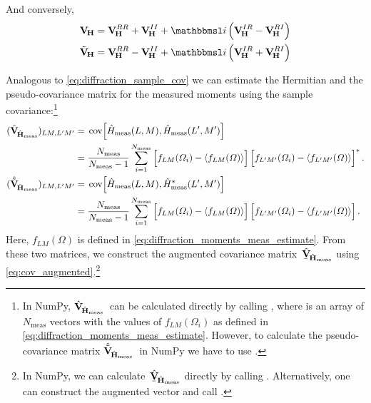 And conversely,
\begin{align}
  \covMatSym_{\!\vect{H}}
  = \covMatSym_{\!\vect{H}}^{RR} + \covMatSym_{\!\vect{H}}^{II} + \imag \rBrk{\covMatSym_{\!\vect{H}}^{IR} - \covMatSym_{\!\vect{H}}^{RI}}
  \\
  \tilde{\covMatSym}_{\!\vect{H}}
  = \covMatSym_{\!\vect{H}}^{RR} - \covMatSym_{\!\vect{H}}^{II} + \imag \rBrk{\covMatSym_{\!\vect{H}}^{IR} + \covMatSym_{\!\vect{H}}^{RI}}
\end{align}

Analogous to \cref{eq:diffraction_sample_cov} we can estimate the
Hermitian and the pseudo-covariance matrix for the measured moments
using the sample covariance:\footnote{In NumPy,
$\hat{\bm{\mathrm{V}}}_{\!\hat{\bm{\mathrm{H}}}_\text{meas}}$~can be calculated
directly by calling , where
 is an array of $N_\text{meas}$ vectors with the values of
$f_{L M}(\Omega_i)$ as defined in
\cref{eq:diffraction_moments_meas_estimate}.  However, to calculate
the pseudo-covariance matrix
$\hat{\tilde{\bm{\mathrm{V}}}}_{\!\hat{\bm{\mathrm{H}}}_\text{meas}}$~in NumPy we
have to use .}
\begin{align}
  (\hat{\covMatSym}_{\!\hat{\vect{H}}_\text{meas}})_{L M, L' M'}
  ={}& \cov[2]{\hat{H}_\text{meas}(L, M), \hat{H}_\text{meas}(L', M')} \notag
  \\
  \label{eq:diffraction_sample_cov_hermit_meas}
  ={}& \frac{N_\text{meas}}{N_\text{meas} - 1} \sum_{i = 1}^{N_\text{meas}}
  \sBrk[2]{f_{L M}(\Omega_i) - \mean{f_{L M}(\Omega)}} \sBrk[2]{f_{L' M'}(\Omega_i) - \mean{f_{L' M'}(\Omega)}}^*.
  \\
  (\hat{\tilde{\covMatSym}}_{\!\hat{\vect{H}}_\text{meas}})_{L M, L' M'}
  ={}& \cov[2]{\hat{H}_\text{meas}(L, M), \hat{H}_\text{meas}^*(L', M')} \notag
  \\
  \label{eq:diffraction_sample_cov_pseudo_meas}
  ={}& \frac{N_\text{meas}}{N_\text{meas} - 1} \sum_{i = 1}^{N_\text{meas}}
  \sBrk[2]{f_{L M}(\Omega_i) - \mean{f_{L M}(\Omega)}} \sBrk[2]{f_{L' M'}(\Omega_i) - \mean{f_{L' M'}(\Omega)}}.
\end{align}
Here, $f_{L M}(\Omega)$ is defined in
\cref{eq:diffraction_moments_meas_estimate}.  From these two matrices,
we construct the augmented covariance
matrix~$\hat{\underaccent{\bar}{\covMatSym}}_{\!\hat{\vect{H}}_\text{meas}}$
using \cref{eq:cov_augmented}.\footnote{In NumPy, we can
calculate~$\hat{\underaccent{\bar}{\covMatSym}}_{\!\hat{\vect{H}}_\text{meas}}$
directly by calling .
Alternatively, one can construct the augmented vector  and call
.}

